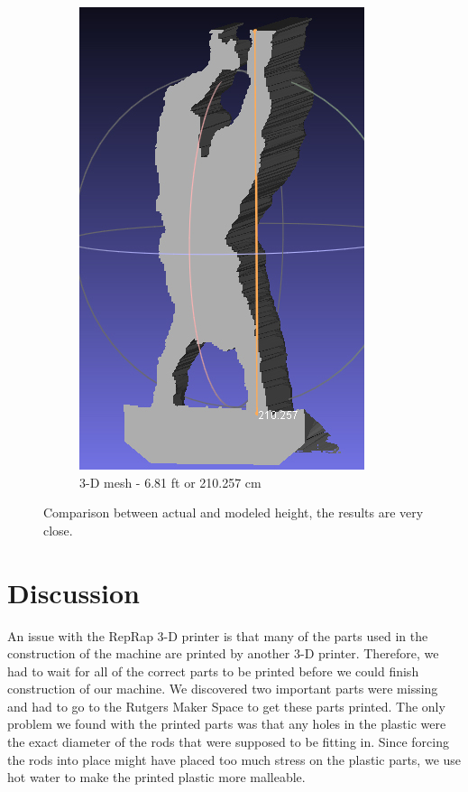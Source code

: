 \documentclass[pdftex,10.5pt]{report}
\begin{document}
\begin{figure}[H]
\begin{subfigure}[H]{0.4\textwidth}
		\includegraphics[width=\textwidth]{figures/ryanhandstandmeasure}
		\caption{3-D mesh - 6.81 ft or 210.257 cm}
	\end{subfigure}
	\caption{Comparison between actual and modeled height, the results are very close.}
	\label{fig:sizes}
\end{figure}
\section{Discussion}
An issue with the RepRap 3-D printer is that many of the parts used in the construction of the machine are printed by another 3-D printer. Therefore, we had to wait for all of the correct parts to be printed before we could finish construction of our machine. We discovered two important parts were missing and had to go to the Rutgers Maker Space to get these parts printed. The only problem we found with the printed parts was that any holes in the plastic were the exact diameter of the rods that were supposed to be fitting in. Since forcing the rods into place might have placed too much stress on the plastic parts, we use hot water to make the printed plastic more malleable.
\end{document}
